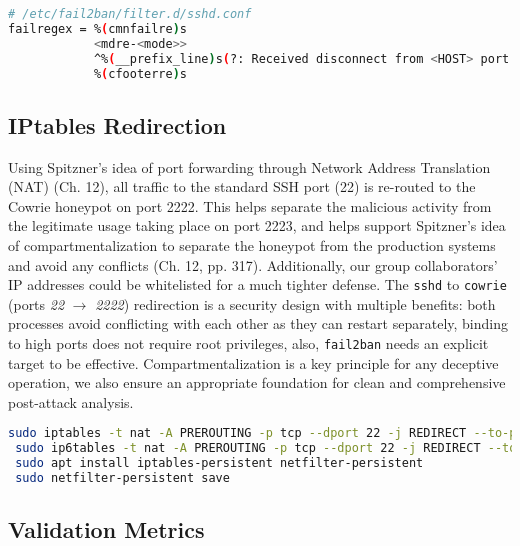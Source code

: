 \documentclass{cls/ULBreport}
\begin{document}
        \begin{lstlisting}[language=bash,caption={Regex Filter Against Key-Based Attacks}]
 # /etc/fail2ban/filter.d/sshd.conf
failregex = %(cmnfailre)s
            <mdre-<mode>>
            ^%(__prefix_line)s(?: Received disconnect from <HOST> port \d+: Too many authentication failures | Disconnected from <HOST> port \d+ due to: Authentication failed for .* publickey )
            %(cfooterre)s
        \end{lstlisting}
        
        
        \subsection{IPtables Redirection}
        Using Spitzner's idea of port forwarding through Network Address Translation (NAT) (Ch. 12), all traffic to the standard SSH port (22) is re-routed to the Cowrie honeypot on port 2222. This helps separate the malicious activity from the legitimate usage taking place on port 2223, and helps support Spitzner's idea of compartmentalization to separate the honeypot from the production systems and avoid any conflicts (Ch. 12, pp. 317). Additionally, our group collaborators' IP addresses could be whitelisted for a much tighter defense. The \texttt{sshd} to \texttt{cowrie} ({ports \textit{22}} $\rightarrow$ \textit{2222}) redirection is a security design with multiple benefits: both processes avoid conflicting with each other as they can restart separately, binding to high ports does not require root privileges, also, \texttt{fail2ban} needs an explicit target to be effective. Compartmentalization is a key principle for any deceptive operation, we also ensure an appropriate foundation for clean and comprehensive post-attack analysis.
        \begin{lstlisting}[language=bash,caption={Traffic Redirection to Cowrie}]
 sudo iptables -t nat -A PREROUTING -p tcp --dport 22 -j REDIRECT --to-port 2222
 sudo ip6tables -t nat -A PREROUTING -p tcp --dport 22 -j REDIRECT --to-port 2222
 sudo apt install iptables-persistent netfilter-persistent
 sudo netfilter-persistent save
        \end{lstlisting}
        


        \subsection{Validation Metrics}  
        \label{sec:validation}  
        
\end{document}

